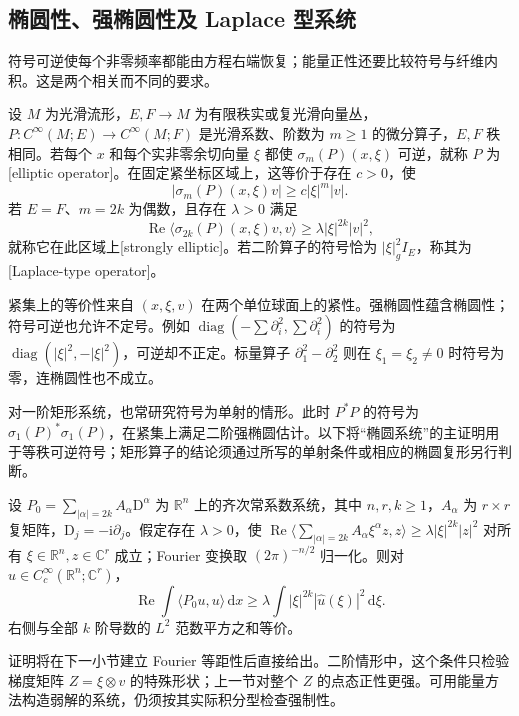 \subsection{椭圆性、强椭圆性及 Laplace 型系统}
\label{g3:subsec:1202:02}
符号可逆使每个非零频率都能由方程右端恢复；能量正性还要比较符号与纤维内积。这是两个相关而不同的要求。

\begin{definition}\label{g3:def:elliptic-system}
	设 \(M\) 为光滑流形，\(E,F\to M\) 为有限秩实或复光滑向量丛，\(P:C^\infty(M;E)\to C^\infty(M;F)\) 是光滑系数、阶数为 \(m\ge1\) 的微分算子，\(E,F\) 秩相同。若每个 \(x\) 和每个实非零余切向量 \(\xi\) 都使 \(\sigma_m(P)(x,\xi)\) 可逆，就称 \(P\) 为[elliptic operator]。在固定紧坐标区域上，这等价于存在 \(c>0\)，使
	\[
		|\sigma_m(P)(x,\xi)v|\ge c|\xi|^m|v|.
	\]
	若 \(E=F\)、\(m=2k\) 为偶数，且存在 \(\lambda>0\) 满足
	\[
		\operatorname{Re}\langle\sigma_{2k}(P)(x,\xi)v,v\rangle
		\ge\lambda|\xi|^{2k}|v|^2,
	\]
	就称它在此区域上[strongly elliptic]。若二阶算子的符号恰为 \(|\xi|_g^2I_E\)，称其为[Laplace-type operator]。
\end{definition}

紧集上的等价性来自 \((x,\xi,v)\) 在两个单位球面上的紧性。强椭圆性蕴含椭圆性；符号可逆也允许不定号。例如 \(\operatorname{diag}(-\sum\partial_i^2,\sum\partial_i^2)\) 的符号为 \(\operatorname{diag}(|\xi|^2,-|\xi|^2)\)，可逆却不正定。标量算子 \(\partial_1^2-\partial_2^2\) 则在 \(\xi_1=\xi_2\ne0\) 时符号为零，连椭圆性也不成立。

\ProseParagraphBreak

对一阶矩形系统，也常研究符号为单射的情形。此时 \(P^*P\) 的符号为 \(\sigma_1(P)^*\sigma_1(P)\)，在紧集上满足二阶强椭圆估计。以下将“椭圆系统”的主证明用于等秩可逆符号；矩形算子的结论须通过所写的单射条件或相应的椭圆复形另行判断。

\begin{proposition}\label{g3:prop:constant-strong-energy}
	设 \(P_0=\sum_{|\alpha|=2k}A_\alpha\mathrm D^\alpha\) 为 \(\mathbb R^n\) 上的齐次常系数系统，其中 \(n,r,k\ge1\)，\(A_\alpha\) 为 \(r\times r\) 复矩阵，\(\mathrm D_j=-\mathrm i\partial_j\)。假定存在 \(\lambda>0\)，使 \(\operatorname{Re}\langle\sum_{|\alpha|=2k}A_\alpha\xi^\alpha z,z\rangle\ge\lambda|\xi|^{2k}|z|^2\) 对所有 \(\xi\in\mathbb R^n,z\in\mathbb C^r\) 成立；Fourier 变换取 \((2\pi)^{-n/2}\) 归一化。则对 \(u\in C_c^\infty(\mathbb R^n;\mathbb C^r)\)，
	\[
		\operatorname{Re}\int\langle P_0u,u\rangle\,\mathrm dx
		\ge\lambda\int|\xi|^{2k}|\widehat u(\xi)|^2\,\mathrm d\xi.
	\]
	右侧与全部 \(k\) 阶导数的 \(L^2\) 范数平方之和等价。
\end{proposition}
证明将在下一小节建立 Fourier 等距性后直接给出。二阶情形中，这个条件只检验梯度矩阵 \(Z=\xi\otimes v\) 的特殊形状；上一节对整个 \(Z\) 的点态正性更强。可用能量方法构造弱解的系统，仍须按其实际积分型检查强制性。

